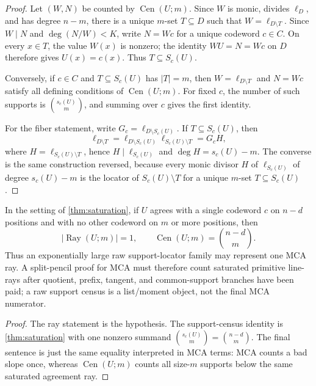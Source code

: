 \documentclass[11pt,a4paper]{amsart}
\numberwithin{equation}{section}
\theoremstyle{remark}
\DeclareMathOperator{\Cen}{Cen}\DeclareMathOperator{\LineRay}{LineRay}\DeclareMathOperator{\dist}{dist}
\begin{document}
\begin{proof}
Let \((W,N)\) be counted by \(\Cen(U;m)\).  Since \(W\) is monic, divides \(\ell_D\), and has degree \(n-m\), there is a unique \(m\)-set \(T\subseteq D\) such that \(W=\ell_{D\setminus T}\).  Since \(W\mid N\) and \(\deg(N/W)<K\), write \(N=Wc\) for a unique codeword \(c\in C\).  On every \(x\in T\), the value \(W(x)\) is nonzero; the identity \(WU=N=Wc\) on \(D\) therefore gives \(U(x)=c(x)\).  Thus \(T\subseteq S_c(U)\).

Conversely, if \(c\in C\) and \(T\subseteq S_c(U)\) has \(|T|=m\), then \(W=\ell_{D\setminus T}\) and \(N=Wc\) satisfy all defining conditions of \(\Cen(U;m)\).  For fixed \(c\), the number of such supports is \(\binom{s_c(U)}m\), and summing over \(c\) gives the first identity.

For the fiber statement, write \(G_c=\ell_{D\setminus S_c(U)}\).  If \(T\subseteq S_c(U)\), then
\[
        \ell_{D\setminus T}
        =\ell_{D\setminus S_c(U)}\ell_{S_c(U)\setminus T}
        =G_cH,
\]
where \(H=\ell_{S_c(U)\setminus T}\), hence \(H\mid\ell_{S_c(U)}\) and \(\deg H=s_c(U)-m\).  The converse is the same construction reversed, because every monic divisor \(H\) of \(\ell_{S_c(U)}\) of degree \(s_c(U)-m\) is the locator of \(S_c(U)\setminus T\) for a unique \(m\)-set \(T\subseteq S_c(U)\).
\end{proof}

\begin{corollary}\label{cor:raw-bc-fails}
In the setting of \cref{thm:saturation}, if \(U\) agrees with a single codeword \(c\) on \(n-d\) positions and with no other codeword on \(m\) or more positions, then
\[
        |\operatorname{Ray}(U;m)|=1,
        \qquad
        \Cen(U;m)=\binom{n-d}{m} .
\]
Thus an exponentially large raw support-locator family may represent one MCA ray.  A split-pencil proof for MCA must therefore count saturated primitive line-rays after quotient, prefix, tangent, and common-support branches have been paid; a raw support census is a list/moment object, not the final MCA numerator.
\end{corollary}

\begin{proof}
The ray statement is the hypothesis.  The support-census identity is \cref{thm:saturation} with one nonzero summand \(\binom{s_c(U)}m=\binom{n-d}m\).  The final sentence is just the same equality interpreted in MCA terms: MCA counts a bad slope once, whereas \(\Cen(U;m)\) counts all size-\(m\) supports below the same saturated agreement ray.
\end{proof}
\end{document}

